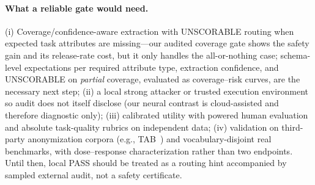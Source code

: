 \documentclass[11pt,a4paper]{article}
\begin{document}
\paragraph{What a reliable gate would need.} (i) Coverage/confidence-aware extraction with UNSCORABLE routing when expected task attributes are missing---our audited coverage gate shows the safety gain and its release-rate cost, but it only handles the all-or-nothing case; schema-level expectations per required attribute type, extraction confidence, and UNSCORABLE on \emph{partial} coverage, evaluated as coverage--risk curves, are the necessary next step; (ii) a local strong attacker or trusted execution environment so audit does not itself disclose (our neural contrast is cloud-assisted and therefore diagnostic only); (iii) calibrated utility with powered human evaluation and absolute task-quality rubrics on independent data; (iv) validation on third-party anonymization corpora (e.g., TAB~\cite{pilan2022tab}) and vocabulary-disjoint real benchmarks, with dose--response characterization rather than two endpoints. Until then, local PASS should be treated as a routing hint accompanied by sampled external audit, not a safety certificate.
\end{document}
